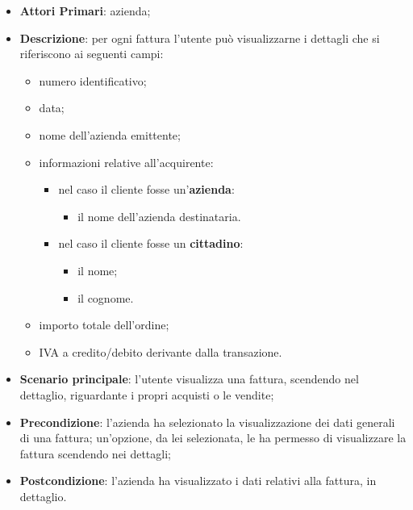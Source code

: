 \begin{itemize}
	\item \textbf{Attori Primari}: azienda;
	\item \textbf{Descrizione}: per ogni fattura l'utente può visualizzarne i dettagli che si riferiscono ai seguenti campi:
	\begin{itemize}
	\item numero identificativo;
	\item data;
	\item nome dell'azienda emittente;
	\item informazioni relative all'acquirente:
	\begin{itemize}
		\item nel caso il cliente fosse un'\textbf{azienda}:
		\begin{itemize}
			\item il nome dell'azienda destinataria.
		\end{itemize}
		\item nel caso il cliente fosse un \textbf{cittadino}:
		\begin{itemize}
			\item il nome;
			\item il cognome.
		\end{itemize}
	\end{itemize}
	\item importo totale dell'ordine;
	\item IVA a credito/debito derivante dalla transazione.
	\end{itemize}
	
	\item \textbf{Scenario principale}: l'utente visualizza una fattura, scendendo nel dettaglio, riguardante i propri acquisti o le vendite;
	\item \textbf{Precondizione}: l'azienda ha selezionato la visualizzazione dei dati generali di una fattura; un'opzione, da lei selezionata, le ha permesso di visualizzare la fattura scendendo nei dettagli;
	\item \textbf{Postcondizione}: l'azienda ha visualizzato i dati relativi alla fattura, in dettaglio.
\end{itemize}

